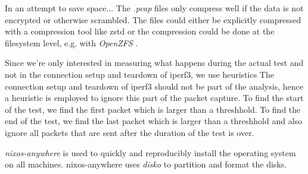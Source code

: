 In an attempt to save space...
The \textit{.pcap} \cite{wiki:Pcap} files only compress well if the data is not encrypted or otherwise scrambled.
The files could either be explicitly compressed with a compression tool like zstd or the compression could be done at the filesystem level, e.g. with \textit{OpenZFS} \cite{OpenZFS}. 


Since we're only interested in measuring what happens during the actual test and not in the connection setup and teardown of iperf3, we use heuristics
The connection setup and teardown of iperf3 should not be part of the analysis, hence a heuristic is employed to ignore this part of the packet capture.
To find the start of the test, we find the first packet which is larger than a threshhold.
To find the end of the test, we find the last packet which is larger than a threshhold and also ignore all packets that are sent after the duration of the test is over.


\textit{nixos-anywhere} \cite{nixos-anywhere} is used to quickly and reproducibly install the operating system on all machines.
nixos-anywhere uses \textit{disko} \cite{disko} to partition and format the disks.



